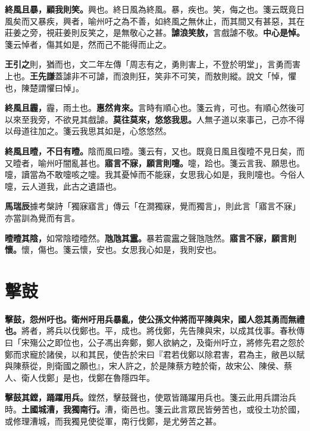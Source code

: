 \textbf{終風且暴，顧我則笑。}{\footnotesize 興也。終日風為終風。暴，疾也。笑，侮之也。箋云既竟日風矣而又暴疾，興者，喻州吁之為不善，如終風之無休止，而其間又有甚惡，其在莊姜之旁，視莊姜則反笑之，是無敬心之甚。}\textbf{謔浪笑敖，}{\footnotesize 言戲謔不敬。}\textbf{中心是悼。}{\footnotesize 箋云悼者，傷其如是，然而己不能得而止之。}

\begin{quoting}\textbf{王引之}則，猶而也，文二年左傳「周志有之，勇則害上，不登於明堂」，言勇而害上也。\textbf{王先謙}蓋謔非不可謔，而浪則狂，笑非不可笑，而敖則縱。說文「悼，懼也，陳楚謂懼曰悼」。\end{quoting}

\textbf{終風且霾，}{\footnotesize 霾，雨土也。}\textbf{惠然肯來。}{\footnotesize 言時有順心也。箋云肯，可也。有順心然後可以來至我旁，不欲見其戲謔。}\textbf{莫往莫來，悠悠我思。}{\footnotesize 人無子道以來事己，己亦不得以母道往加之。箋云我思其如是，心悠悠然。}

\textbf{終風且曀，不日有曀。}{\footnotesize 陰而風曰曀。箋云有，又也。既竟日風且復曀不見日矣，而又曀者，喻州吁闇亂甚也。}\textbf{寤言不寐，願言則嚏。}{\footnotesize 嚏，跲也。箋云言我、願思也。嚏，讀當為不敢嚏咳之嚏。我其憂悼而不能寐，女思我心如是，我則嚏也。今俗人嚏，云人道我，此古之遺語也。}

\begin{quoting}\textbf{馬瑞辰}據考槃詩「獨寐寤言」傳云「在澗獨寐，覺而獨言」，則此言「寤言不寐」亦當訓為覺而有言。\end{quoting}

\textbf{曀曀其陰，}{\footnotesize 如常陰曀曀然。}\textbf{虺虺其靁。}{\footnotesize 暴若震靁之聲虺虺然。}\textbf{寤言不寐，願言則懷。}{\footnotesize 懷，傷也。箋云懷，安也。女思我心如是，我則安也。}

\section{擊鼓}


\textbf{擊鼓，怨州吁也。衛州吁用兵暴亂，使公孫文仲將而平陳與宋，國人怨其勇而無禮也。}{\footnotesize 將者，將兵以伐鄭也。平，成也。將伐鄭，先告陳與宋，以成其伐事。春秋傳曰「宋殤公之即位也，公子馮出奔鄭，鄭人欲納之，及衛州吁立，將修先君之怨於鄭而求寵於諸侯，以和其民，使告於宋曰『君若伐鄭以除君害，君為主，敝邑以賦與陳蔡從，則衛國之願也』，宋人許之，於是陳蔡方睦於衛，故宋公、陳侯、蔡人、衛人伐鄭」是也，伐鄭在魯隱四年。}

\textbf{擊鼓其鏜，踊躍用兵。}{\footnotesize 鏜然，擊鼓聲也，使眾皆踊躍用兵也。箋云此用兵謂治兵時。}\textbf{土國城漕，我獨南行。}{\footnotesize 漕，衛邑也。箋云此言眾民皆勞苦也，或役土功於國，或修理漕城，而我獨見使從軍，南行伐鄭，是尤勞苦之甚。}

